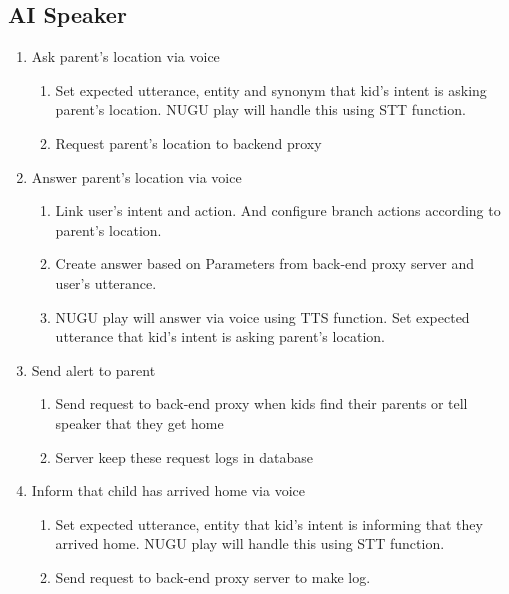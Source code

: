 \documentclass[conference]{IEEEtran}
\begin{document}
\subsection{AI Speaker}
\begin{enumerate}
    \item Ask parent’s location via voice
    \begin{enumerate}
        \item Set expected utterance, entity and synonym that kid’s intent is asking parent’s location. NUGU play will handle this using STT function.
        \item  Request parent’s location to backend proxy\\
    \end{enumerate}
    \item Answer parent’s location via voice
    \begin{enumerate}
        \item Link user’s intent and action. And configure branch actions according to parent’s location.
        \item Create answer based on Parameters from back-end proxy server and user’s utterance.
        \item NUGU play will answer via voice using TTS function. Set expected utterance that kid’s intent is asking parent’s location.\\

    \end{enumerate}
    \item Send alert to parent
    \begin{enumerate}
        \item Send request to back-end proxy when kids find their parents or tell speaker that they get home
        \item Server keep these request logs in database\\
    \end{enumerate}
    \item Inform that child has arrived home via voice
    \begin{enumerate}
        \item Set expected utterance, entity that kid’s intent is informing that they arrived home. NUGU play will handle this using STT function.
        \item Send request to back-end proxy server to make log.\\
    \end{enumerate}
\end{enumerate}
\end{document}
